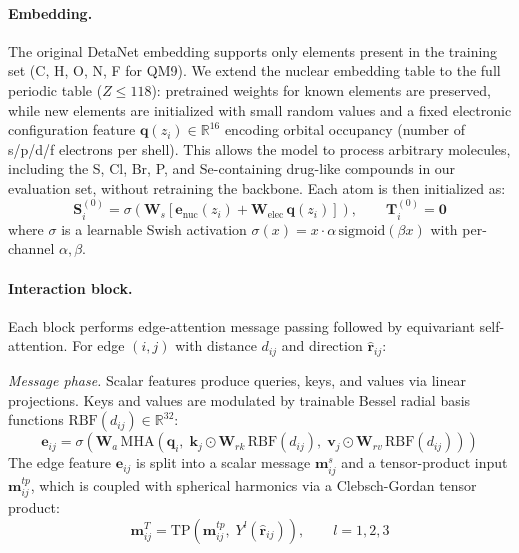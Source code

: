 \documentclass[10pt]{article}
\begin{document}
\paragraph{Embedding.} The original DetaNet embedding supports only elements present in the training set (C, H, O, N, F for QM9). We extend the nuclear embedding table to the full periodic table ($Z \leq 118$): pretrained weights for known elements are preserved, while new elements are initialized with small random values and a fixed electronic configuration feature $\mathbf{q}(z_i) \in \mathbb{R}^{16}$ encoding orbital occupancy (number of s/p/d/f electrons per shell). This allows the model to process arbitrary molecules, including the S, Cl, Br, P, and Se-containing drug-like compounds in our evaluation set, without retraining the backbone. Each atom is then initialized as:
\begin{equation}
    \mathbf{S}_i^{(0)} = \sigma\!\left(\mathbf{W}_s\left[\mathbf{e}_{\mathrm{nuc}}(z_i) + \mathbf{W}_{\mathrm{elec}}\,\mathbf{q}(z_i)\right]\right), \qquad \mathbf{T}_i^{(0)} = \mathbf{0}
\end{equation}
where $\sigma$ is a learnable Swish activation $\sigma(x) = x \cdot \alpha\,\mathrm{sigmoid}(\beta x)$ with per-channel $\alpha, \beta$.

\paragraph{Interaction block.} Each block performs edge-attention message passing followed by equivariant self-attention. For edge $(i,j)$ with distance $d_{ij}$ and direction $\hat{\mathbf{r}}_{ij}$:

\emph{Message phase.} Scalar features produce queries, keys, and values via linear projections. Keys and values are modulated by trainable Bessel radial basis functions $\mathrm{RBF}(d_{ij}) \in \mathbb{R}^{32}$:
\begin{equation}
    \mathbf{e}_{ij} = \sigma\!\left(\mathbf{W}_a\,\mathrm{MHA}\!\left(\mathbf{q}_i,\; \mathbf{k}_j \odot \mathbf{W}_{rk}\,\mathrm{RBF}(d_{ij}),\; \mathbf{v}_j \odot \mathbf{W}_{rv}\,\mathrm{RBF}(d_{ij})\right)\right)
\end{equation}
The edge feature $\mathbf{e}_{ij}$ is split into a scalar message $\mathbf{m}^s_{ij}$ and a tensor-product input $\mathbf{m}^{tp}_{ij}$, which is coupled with spherical harmonics via a Clebsch-Gordan tensor product:
\begin{equation}
    \mathbf{m}^T_{ij} = \mathrm{TP}\!\left(\mathbf{m}^{tp}_{ij},\; Y^l(\hat{\mathbf{r}}_{ij})\right), \qquad l = 1,2,3
    \label{eq:tp-message}
\end{equation}
\end{document}
